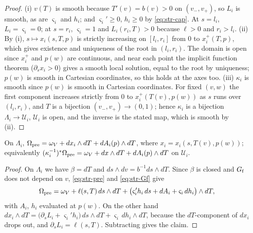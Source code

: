 \begin{proof}
(i) $v(T)$ is smooth because $T'(v)=b(v)>0$ on $(v_-,v_+)$, so $L_i$ is smooth, as are $\varsigma_i$ and $h_i$; and
$\varsigma_i'\ge0$, $h_i\ge0$ by \eqref{eq:str-cap}. At $s=l_i$, $L_i=\varsigma_i=0$; at $s=r_i$, $\varsigma_i=1$ and
$L_i(r_i,T)>0$ because $\ell>0$ and $r_i>l_i$.
(ii) By (i), $s\mapsto x_i(s,T,p)$ is strictly increasing on $[l_i,r_i]$ from $0$ to $x_i^+(T,p)$, which gives existence and
uniqueness of the root in $(l_i,r_i)$. The domain is open since $x_i^+$ and $p(w)$ are continuous, and near each point the
implicit function theorem ($\partial_sx_i>0$) gives a smooth local solution, equal to the root by uniqueness; $p(w)$ is smooth
in Cartesian coordinates, so this holds at the axes too.
(iii) $\kappa_i$ is smooth since $p(w)$ is smooth in Cartesian coordinates. For fixed $(v,w)$ the first component increases
strictly from $0$ to $x_i^+(T(v),p(w))$ as $s$ runs over $(l_i,r_i)$, and $T$ is a bijection $(v_-,v_+)\to(0,1)$; hence
$\kappa_i$ is a bijection $\Lambda_i\to\mathcal U_i$, $\mathcal U_i$ is open, and the inverse is the stated map, which is smooth
by (ii).
\end{proof}

\begin{lemma}\label{lem:str-layer-form}
On $\Lambda_i$, $\Omega_{\rm pre}=\omega_V+dx_i\wedge dT+dA_i(p)\wedge dT$, where $x_i=x_i(s,T(v),p(w))$; equivalently
$(\kappa_i^{-1})^*\Omega_{\rm pre}=\omega_V+dx\wedge dT+dA_i(p)\wedge dT$ on $\mathcal U_i$.
\end{lemma}

\begin{proof}
On $\Lambda_i$ we have $\beta=dT$ and $ds\wedge dv=b^{-1}ds\wedge dT$. Since $\beta$ is closed and $G_{\rm f}$ does not depend on
$v$, \eqref{eq:str-pre} and \eqref{eq:str-Gf} give
\[
 \Omega_{\rm pre}=\omega_V+\ell(s,T)\,ds\wedge dT+\big(\varsigma_i'h_i\,ds+dA_i+\varsigma_i\,dh_i\big)\wedge dT ,
\]
with $A_i$, $h_i$ evaluated at $p(w)$. On the other hand
$dx_i\wedge dT=\big(\partial_sL_i+\varsigma_i'h_i\big)\,ds\wedge dT+\varsigma_i\,dh_i\wedge dT$, because the $dT$-component of $dx_i$
drops out, and $\partial_sL_i=\ell(s,T)$. Subtracting gives the claim.
\end{proof}

